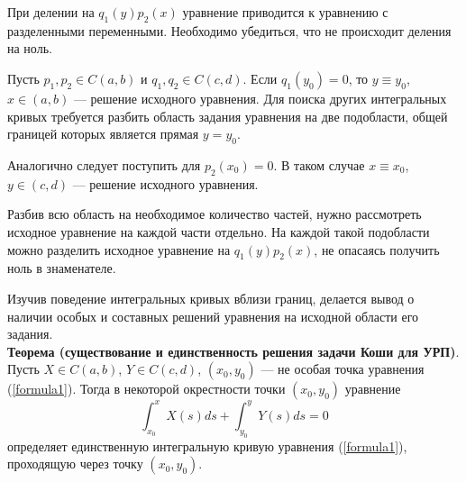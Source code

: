 При делении на $q_1(y)p_2(x)$ уравнение приводится к уравнению с разделенными переменными. Необходимо убедиться, что не происходит деления на ноль.

Пусть $p_1, p_2 \in C(a,b)$ и $q_1, q_2 \in C(c,d)$. Если $q_1(y_0) = 0$, то $y \equiv y_0$, $x \in (a,b)$ --- решение исходного уравнения. Для поиска других интегральных кривых требуется разбить область задания уравнения на две подобласти, общей границей которых является прямая $y = y_0$.

Аналогично следует поступить для $p_2(x_0) = 0$. В таком случае $x \equiv x_0$, $y \in (c,d)$ --- решение исходного уравнения.

Разбив всю область на необходимое количество частей, нужно рассмотреть исходное уравнение на каждой части отдельно. На каждой такой подобласти можно разделить исходное уравнение на $q_1(y)p_2(x)$, не опасаясь получить ноль в знаменателе.

Изучив поведение интегральных кривых вблизи границ, делается вывод о наличии особых и составных решений уравнения на исходной области его задания.\\

\textbf{Теорема (существование и единственность решения задачи Коши для УРП)}. Пусть $X \in C(a,b)$, $Y \in C(c,d)$, $(x_0, y_0)$ --- не особая точка уравнения (\ref{formula1}). Тогда в некоторой окрестности точки $(x_0, y_0)$ уравнение
\begin{equation*}
    \int_{x_0}^{x} X(s)ds + \int_{y_0}^{y} Y(s)ds = 0
\end{equation*}
определяет единственную интегральную кривую уравнения (\ref{formula1}), проходящую через точку $(x_0, y_0)$.
